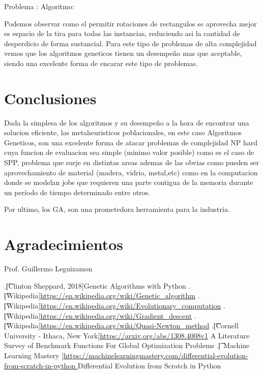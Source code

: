 \documentclass[10pt]{article}
\begin{document}
Problema :  \newline%
%
 Algoritmo: %


Podemos observar como el permitir rotaciones de rectangulos se aprovecha mejor es espacio de la tira para todas las instancias, reduciendo asi la cantidad de desperdicio de forma sustancial. Para este tipo de problemas de alta complejidad vemos que los algoritmos geneticos tienen un desempeño mas que aceptable, siendo una excelente forma de encarar este tipo de problemas.


\section{Conclusiones}
Dada la simplesa de los algoritmos y su desempeño a la hora de encontrar una solucion eficiente, las metaheuristicos poblacionales, en este caso Algoritmos Geneticos, son una excelente forma de atacar problemas de complejidad NP hard cuya funcion de evaluacion sea simple (minimo valor posible) como es el caso de SPP, problema que surje en distintas areas ademas de las obvias como pueden ser aprovechamiento de material (madera, vidrio, metal,etc) como en la computacion donde se modelan jobs que requieren una parte contigua de la memoria durante un período de tiempo determinado entre otros.

Por ultimo, los GA, son una prometedora herramienta para la industria.

\section*{Agradecimientos}
Prof. Guillermo Leguizamon


\begin{thebibliography}{99} %
.\t[Clinton Sheppard, 2018]{}Genetic Algorithms with Python
.\t[Wikipedia]{}\url{https://en.wikipedia.org/wiki/Genetic_algorithm}
.\t[Wikipedia]{}\url{https://en.wikipedia.org/wiki/Evolutionary_computation}
.\t[Wikipedia]{}\url{https://en.wikipedia.org/wiki/Gradient_descent}
.\t[Wikipedia]{}\url{https://en.wikipedia.org/wiki/Quasi-Newton_method}
.\t[Cornell University - Ithaca, New York]{}\url{https://arxiv.org/abs/1308.4008v1} A Literature Survey of Benchmark Functions For Global Optimization Problems
.\t[ Machine Learning Mastery ]{}\url{https://machinelearningmastery.com/differential-evolution-from-scratch-in-python } Differential Evolution from Scratch in Python


\end{thebibliography} 
 
\end{document}
